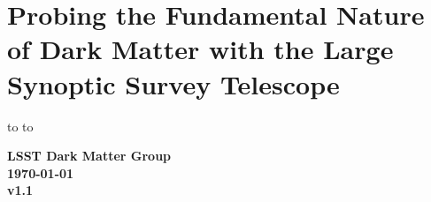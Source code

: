 \documentclass[titlepage,oneside]{tcibook}
\begin{document}
\raggedbottom


\parindent=0pt
\parskip=8pt
\setlength{\evensidemargin}{0pt}
\setlength{\oddsidemargin}{0pt}
\setlength{\marginparsep}{0.0in}
\setlength{\marginparwidth}{0.0in}
\marginparpush=0pt


\renewcommand{\chapname}{chap:intro_}
\renewcommand{\chapterdir}{.}
\renewcommand{\arraystretch}{1.25}
\addtolength{\arraycolsep}{-3pt}
\renewcommand{\paragraph}[1]{\emph{#1}\xspace}

\chapter*{Probing the Fundamental Nature of Dark Matter with the Large Synoptic Survey Telescope}
\vskip -9.5pt
\hbox to
\vskip-6.5pt
\hbox to


\begin{center}
  {\Large\bf
    LSST Dark Matter Group\\
    \bigskip
    \today\\
    \bigskip
     v1.1
  }
\end{center}
\eject

\setcounter{page}{1}



\clearpage


\tableofcontents 

\eject
{} 
\setcounter{page}{1}




\end{document}
